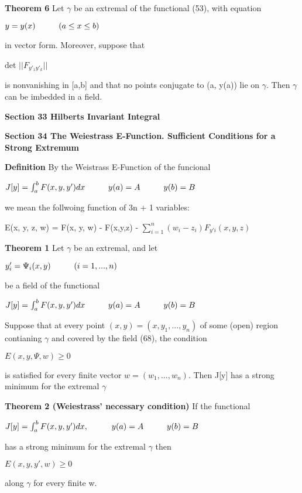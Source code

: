\documentclass{article}
\newcommand\tab[1][1cm]{\hspace*{#1}}
\begin{document}
\textbf {Theorem 6} Let $\gamma$ be an extremal of the functional (53), with equation 
\begin{center}
$ y = y(x) \tab (a \leq x \leq b)$
\end{center}
in vector form. Moreover, suppose that
\begin{center}
det $||F_{y'_1y'_k}||$
\end{center}
is nonvanishing in [a,b] and that no points conjugate to (a, y(a)) lie on $\gamma$. Then $\gamma$ can be imbedded in a field.

\textbf {Section 33 Hilberts Invariant Integral}

\textbf {Section 34 The Weiestrass E-Function. Sufficient Conditions for a Strong Extremum}

\textbf {Definition} By the Weistrass E-Function of the funcional
\begin{center}
$J[y] = \int_a^b F(x,y,y') dx \tab y(a) = A \tab y(b) = B$
\end{center}
we mean the follwoing function of 3n + 1 variables:
\begin{center}
E(x, y, z, w) = F(x, y, w) - F(x,y,z) - $ \sum_{i=1}^n (w_i - z_i) F_{y'i}(x,y,z)$
\end{center}

\textbf {Theorem 1} Let $\gamma$ be an extremal, and let 
\begin{center}
$y'_i = \Psi_i(x,y) \tab (i = 1,...,n)$
\end{center}
be a field of the functional
\begin{center}
$J[y] = \int_a^b F(x,y,y') dx \tab y(a) = A \tab y(b) = B$
\end{center}
Suppose that at every point $(x,y) = (x,y_1,...,y_n)$ of some (open) region contianing $\gamma$ and covered by the field (68), the condition
\begin{center}
$E(x,y,\Psi, w) \geq 0$
\end{center}
is satisfied for every finite vector $w = (w_1 ,..., w_n)$. Then J[y] has a strong minimum for the extremal $\gamma$

\textbf {Theorem 2 (Weiestrass' necessary condition)} If the functional 
\begin{center}
$J[y] = \int_a^b F(x,y,y') dx, \tab y(a) = A \tab y(b) = B$
\end{center}
has a strong minimum for the extremal $\gamma$ then
\begin{center}
$E(x,y,y',w) \geq 0$
\end{center}
along $\gamma$ for every finite w.
\end{document}
